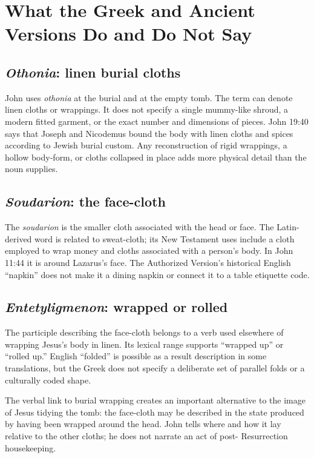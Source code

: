 \section{What the Greek and Ancient Versions Do and Do Not Say}

\subsection{\emph{Othonia}: linen burial cloths}

John uses \emph{othonia} at the burial and at the empty tomb. The term can
denote linen cloths or wrappings. It does not specify a single mummy-like
shroud, a modern fitted garment, or the exact number and dimensions of pieces.
John 19:40 says that Joseph and Nicodemus bound the body with linen cloths and
spices according to Jewish burial custom. Any reconstruction of rigid
wrappings, a hollow body-form, or cloths collapsed in place adds more physical
detail than the noun supplies.

\subsection{\emph{Soudarion}: the face-cloth}

The \emph{soudarion} is the smaller cloth associated with the head or face.
The Latin-derived word is related to sweat-cloth; its New Testament uses include
a cloth employed to wrap money and cloths associated with a person's body.
In John 11:44 it is around Lazarus's face. The Authorized Version's historical
English ``napkin'' does not make it a dining napkin or connect it to a table
etiquette code.

\subsection{\emph{Entetyligmenon}: wrapped or rolled}

The participle describing the face-cloth belongs to a verb used elsewhere of
wrapping Jesus's body in linen. Its lexical range supports ``wrapped up'' or
``rolled up.'' English ``folded'' is possible as a result description in some
translations, but the Greek does not specify a deliberate set of parallel
folds or a culturally coded shape.

The verbal link to burial wrapping creates an important alternative to the
image of Jesus tidying the tomb: the face-cloth may be described in the state
produced by having been wrapped around the head. John tells where and how it
lay relative to the other cloths; he does not narrate an act of post-
Resurrection housekeeping.

